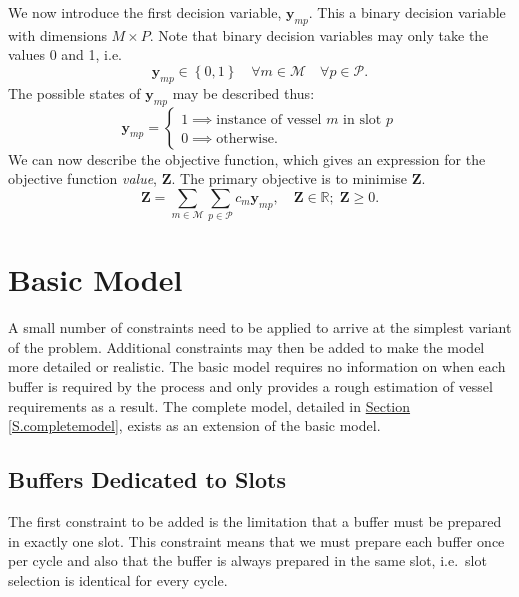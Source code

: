 We now introduce the first decision variable, $\boldsymbol{y}_{mp}$.
This a binary decision variable with dimensions $M \times P$.
Note that binary decision variables may only take the values 0 and 1, i.e.
\begin{equation}
    \boldsymbol{y}_{mp} \in \left\{ 0, 1 \right\} \quad \forall m \in
    \mathcal{M} \quad \forall p \in \mathcal{P}.
    \label{eq.y}
\end{equation}
The possible states of $\boldsymbol{y}_{mp}$ may be described thus:
\begin{equation}
    \boldsymbol{y}_{mp} =
    \begin{cases}
        1 \implies \text{instance of vessel $m$ in slot $p$}\\
        0 \implies \text{otherwise.}
    \end{cases}
\end{equation}
We can now describe the objective function, which gives an expression for the
objective function \emph{value}, $\boldsymbol{Z}$.
The primary objective is to minimise $\boldsymbol{Z}$.
\begin{equation}
    \boldsymbol{Z} = \sum_{m \in \mathcal{M}} \sum_{p \in \mathcal{P}} 
    c_m \boldsymbol{y}_{mp}, \quad \boldsymbol{Z} \in \mathbb{R}; \;
    \boldsymbol{Z} \ge 0.
    \label{eq.objfn}
\end{equation}

\section{Basic Model}\label{S.basicprob}

A small number of constraints need to be applied to arrive at the simplest
variant of the problem.
Additional constraints may then be added to make the model more detailed or
realistic.
The basic model requires no information on when each buffer is required by the
process and only provides a rough estimation of vessel requirements as a
result.
The complete model, detailed in
\hyperref[S.completemodel]{Section \ref*{S.completemodel}}, exists as an
extension of the basic model.

\subsection{Buffers Dedicated to Slots}\label{SS.constr1}

The first constraint to be added is the limitation that a buffer must be
prepared in exactly one slot.
This constraint means that we must prepare each buffer once per cycle
and also that the buffer is always prepared in the same slot, i.e.\ slot
selection is identical for every cycle.

